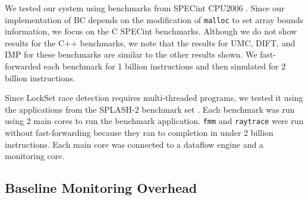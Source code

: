 We tested our system using benchmarks from SPECint
CPU2006 \cite{spec2006}. Since our implementation of BC depends on the
modification of {\tt malloc} to set array bounds information, we focus on the C
SPECint benchmarks. Although we do not
show results for the C++ benchmarks, we note that the results for UMC, DIFT, and IMP
for these benchmarks are similar to the other results shown.
We fast-forwarded each benchmark for 1 billion instructions and then simulated for 2 billion instructions. 

Since LockSet race detection requires multi-threaded programs, we tested it using
the applications from the SPLASH-2 benchmark set \cite{splash-isca95}. 
Each benchmark was run using 2 main cores to run the benchmark application.
{\tt fmm} and {\tt raytrace} were run without fast-forwarding because they ran to completion in under 2 billion instructions.
Each main core was connected to a dataflow engine and a monitoring core.

\subsection{Baseline Monitoring Overhead}



